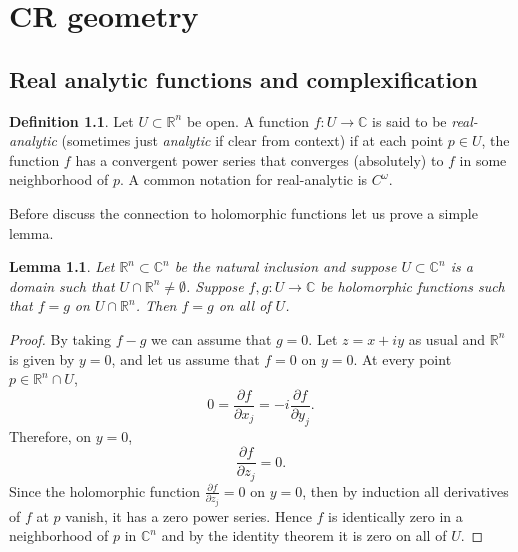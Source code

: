 \documentclass[12pt,openany]{book}
\newcommand{\C}{{\mathbb{C}}}
\newcommand{\R}{{\mathbb{R}}}
\newcommand{\myindex}[1]{#1\index{#1}}
\theoremstyle{plain}
\newtheorem{lemma}[thm]{Lemma}
\theoremstyle{remark}
\theoremstyle{definition}
\newtheorem{defn}[thm]{Definition}
\theoremstyle{exercise}
\theoremstyle{example}
\begin{document}

\chapter{CR geometry} \label{ch:crgeometry}


\section{Real analytic functions and complexification}

\begin{defn}
Let $U \subset \R^n$ be open.
A function $f \colon U \to \C$ is said to be
\emph{\myindex{real-analytic}} (sometimes just \emph{analytic} if
clear from context) if at each point $p \in U$, the function $f$
has a convergent power series that converges (absolutely) to $f$ in some
neighborhood of $p$.
A common notation for real-analytic is $C^\omega$.
\end{defn}

Before discuss the connection to holomorphic functions let us prove a simple
lemma.

\begin{lemma}
Let $\R^n \subset \C^n$ be the natural inclusion and suppose
$U \subset \C^n$ is a domain such that $U \cap \R^n \not= \emptyset$.
Suppose $f,g \colon U \to \C$ be holomorphic functions such that
$f=g$ on $U \cap \R^n$.  Then $f=g$ on all of $U$.
\end{lemma}

\begin{proof}
By taking $f-g$ we can assume that $g=0$.
Let $z = x+iy$ as usual and $\R^n$ is given by $y=0$,
and let us assume that $f = 0$ on $y=0$.
At every point $p \in \R^n \cap U$, 
\begin{equation*}
0 = \frac{\partial f}{\partial x_j} =
-i \frac{\partial f}{\partial y_j} .
\end{equation*}
Therefore, on $y=0$,
\begin{equation*}
\frac{\partial f }{\partial z_j} = 0 .
\end{equation*}
Since the holomorphic function $\frac{\partial f }{\partial z_j} = 0$ on $y=0$, then
by induction all derivatives of $f$ at $p$ vanish, it has a zero 
power series.  Hence $f$ is identically zero in a neighborhood of
$p$ in $\C^n$ and by the identity theorem it is zero on all of $U$.
\end{proof}
\end{document}
